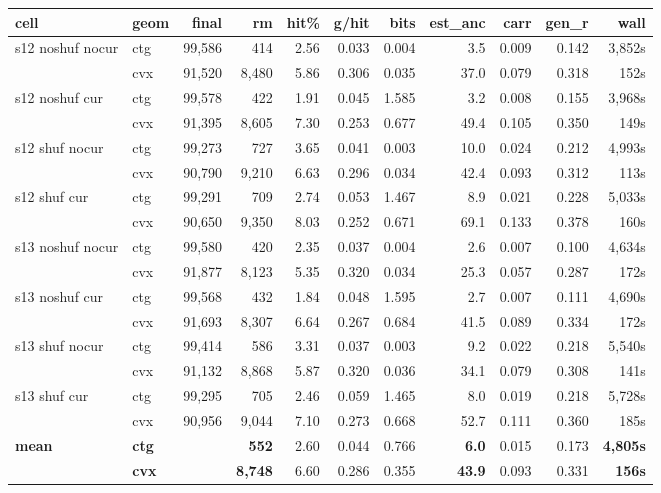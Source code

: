\documentclass[11pt]{article}
\begin{document}
\begin{table}[h]\centering\footnotesize
\begin{tabular}{llrrrrrrrrr}
\toprule
cell & geom & final & rm & hit\% & g/hit & bits & est\_anc & carr & gen\_r & wall \\
\midrule
s12 noshuf nocur & ctg & 99{,}586 & 414 & 2.56 & 0.033 & 0.004 & 3.5 & 0.009 & 0.142 & 3{,}852s \\
                 & cvx & 91{,}520 & 8{,}480 & 5.86 & 0.306 & 0.035 & 37.0 & 0.079 & 0.318 & 152s \\
s12 noshuf cur & ctg & 99{,}578 & 422 & 1.91 & 0.045 & 1.585 & 3.2 & 0.008 & 0.155 & 3{,}968s \\
               & cvx & 91{,}395 & 8{,}605 & 7.30 & 0.253 & 0.677 & 49.4 & 0.105 & 0.350 & 149s \\
s12 shuf nocur & ctg & 99{,}273 & 727 & 3.65 & 0.041 & 0.003 & 10.0 & 0.024 & 0.212 & 4{,}993s \\
               & cvx & 90{,}790 & 9{,}210 & 6.63 & 0.296 & 0.034 & 42.4 & 0.093 & 0.312 & 113s \\
s12 shuf cur & ctg & 99{,}291 & 709 & 2.74 & 0.053 & 1.467 & 8.9 & 0.021 & 0.228 & 5{,}033s \\
             & cvx & 90{,}650 & 9{,}350 & 8.03 & 0.252 & 0.671 & 69.1 & 0.133 & 0.378 & 160s \\
s13 noshuf nocur & ctg & 99{,}580 & 420 & 2.35 & 0.037 & 0.004 & 2.6 & 0.007 & 0.100 & 4{,}634s \\
                 & cvx & 91{,}877 & 8{,}123 & 5.35 & 0.320 & 0.034 & 25.3 & 0.057 & 0.287 & 172s \\
s13 noshuf cur & ctg & 99{,}568 & 432 & 1.84 & 0.048 & 1.595 & 2.7 & 0.007 & 0.111 & 4{,}690s \\
               & cvx & 91{,}693 & 8{,}307 & 6.64 & 0.267 & 0.684 & 41.5 & 0.089 & 0.334 & 172s \\
s13 shuf nocur & ctg & 99{,}414 & 586 & 3.31 & 0.037 & 0.003 & 9.2 & 0.022 & 0.218 & 5{,}540s \\
               & cvx & 91{,}132 & 8{,}868 & 5.87 & 0.320 & 0.036 & 34.1 & 0.079 & 0.308 & 141s \\
s13 shuf cur & ctg & 99{,}295 & 705 & 2.46 & 0.059 & 1.465 & 8.0 & 0.019 & 0.218 & 5{,}728s \\
             & cvx & 90{,}956 & 9{,}044 & 7.10 & 0.273 & 0.668 & 52.7 & 0.111 & 0.360 & 185s \\
\midrule
\textbf{mean} & \textbf{ctg} & & \textbf{552} & 2.60 & 0.044 & 0.766 & \textbf{6.0} & 0.015 & 0.173 & \textbf{4{,}805s} \\
              & \textbf{cvx} & & \textbf{8{,}748} & 6.60 & 0.286 & 0.355 & \textbf{43.9} & 0.093 & 0.331 & \textbf{156s} \\
\bottomrule
\end{tabular}
\end{table}
\end{document}
